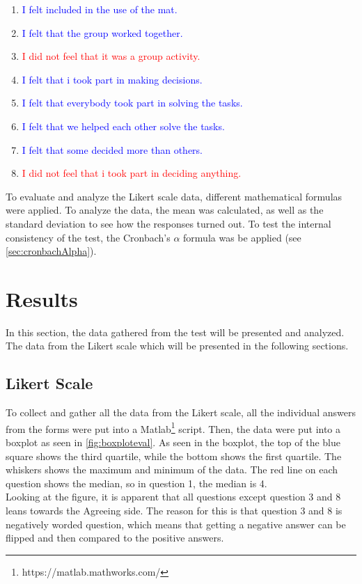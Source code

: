 \begin{enumerate}
	\item  \textcolor{blue}{I felt included in the use of the mat.}
	\item  \textcolor{blue}{I felt that the group worked together.}
	\item  \textcolor{red}{I did not feel that it was a group activity.}
	\item  \textcolor{blue}{I felt that i took part in making decisions.}
	\item  \textcolor{blue}{I felt that everybody took part in solving the tasks.}
	\item  \textcolor{blue}{I felt that we helped each other solve the tasks.}
	\item  \textcolor{blue}{I felt that some decided more than others.}
	\item  \textcolor{red}{I did not feel that i took part in deciding anything.}\\
\end{enumerate}
To evaluate and analyze the Likert scale data, different mathematical formulas were applied. To analyze the data, the mean was calculated, as well as the standard deviation to see how the responses turned out. To test the internal consistency of the test, the Cronbach's $\alpha$ formula was be applied (see \autoref{sec:cronbachAlpha}).


\section{Results}
In this section, the data gathered from the test will be presented and analyzed. The data from the Likert scale which will be presented in the following sections.

\subsection{Likert Scale}
To collect and gather all the data from the Likert scale, all the individual answers from the forms were put into a Matlab\footnote{https://matlab.mathworks.com/} script. Then, the data were put into a boxplot as seen in \autoref{fig:boxploteval}. As seen in the boxplot, the top of the blue square shows the third quartile, while the bottom shows the first quartile. The whiskers shows the maximum and minimum of the data. The red line on each question shows the median, so in question 1, the median is 4.\\
Looking at the figure, it is apparent that all questions except question 3 and 8 leans towards the Agreeing side. The reason for this is that question 3 and 8 is negatively worded question, which means that getting a negative answer can be flipped and then compared to the positive answers.

